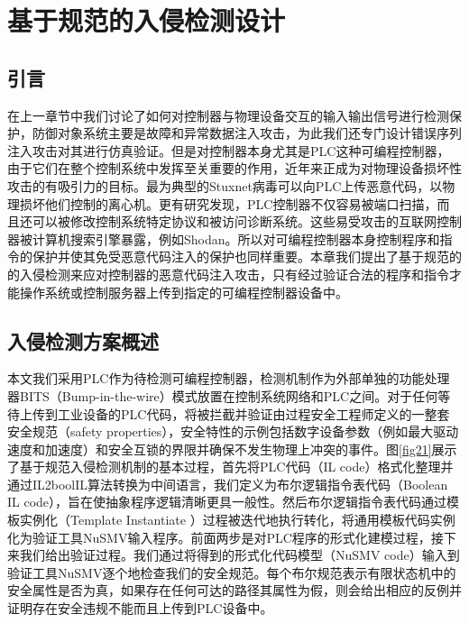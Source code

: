 

\chapter{基于规范的入侵检测设计}
\label{chap:spec detection}

\section{引言}
\label{sec:intro}
在上一章节中我们讨论了如何对控制器与物理设备交互的输入输出信号进行检测保护，防御对象系统主要是故障和异常数据注入攻击，为此我们还专门设计错误序列注入攻击对其进行仿真验证。但是对控制器本身尤其是PLC这种可编程控制器，由于它们在整个控制系统中发挥至关重要的作用，近年来正成为对物理设备损坏性攻击的有吸引力的目标。最为典型的Stuxnet病毒可以向PLC上传恶意代码，以物理损坏他们控制的离心机。更有研究发现，PLC控制器不仅容易被端口扫描，而且还可以被修改控制系统特定协议和被访问诊断系统。这些易受攻击的互联网控制器被计算机搜索引擎暴露，例如Shodan。所以对可编程控制器本身控制程序和指令的保护并使其免受恶意代码注入的保护也同样重要。本章我们提出了基于规范的的入侵检测来应对控制器的恶意代码注入攻击，只有经过验证合法的程序和指令才能操作系统或控制服务器上传到指定的可编程控制器设备中。

\section{入侵检测方案概述}
\label{sec:list}

本文我们采用PLC作为待检测可编程控制器，检测机制作为外部单独的功能处理器BITS（Bump-in-the-wire）模式放置在控制系统网络和PLC之间。对于任何等待上传到工业设备的PLC代码，将被拦截并验证由过程安全工程师定义的一整套安全规范（safety properties），安全特性的示例包括数字设备参数（例如最大驱动速度和加速度）和安全互锁的界限并确保不发生物理上冲突的事件。图\ref{fig21}展示了基于规范入侵检测机制的基本过程，首先将PLC代码（IL code）格式化整理并通过IL2boolIL算法转换为中间语言，我们定义为布尔逻辑指令表代码（Boolean IL code），旨在使抽象程序逻辑清晰更具一般性。然后布尔逻辑指令表代码通过模板实例化（Template Instantiate
）过程被迭代地执行转化，将通用模板代码实例化为验证工具NuSMV输入程序。前面两步是对PLC程序的形式化建模过程，接下来我们给出验证过程。我们通过将得到的形式化代码模型（NuSMV code）输入到验证工具NuSMV逐个地检查我们的安全规范。每个布尔规范表示有限状态机中的安全属性是否为真，如果存在任何可达的路径其属性为假，则会给出相应的反例并证明存在安全违规不能而且上传到PLC设备中。

